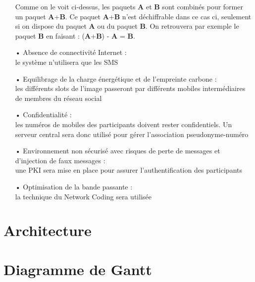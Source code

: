 \documentclass[a4paper, 12pt]{article}
\begin{document}
\begin{itemize}
            Comme on le voit ci-dessus, les paquets \textbf{A} et \textbf{B} sont combinés pour former un paquet \textbf{A}+\textbf{B}. Ce paquet \textbf{A}+\textbf{B} n'est déchiffrable dans ce cas ci, seulement si on dispose du paquet \textbf{A} ou du paquet \textbf{B}.
            On retrouvera par exemple le paquet \textbf{B} en faisant : (\textbf{A}+\textbf{B}) - \textbf{A} = \textbf{B}.
            \\
            
    \item [•] Absence de connectivité Internet :
    \\
    le système n'utilisera que les SMS
    \\
    
    \item [•] Equilibrage de la charge énergétique et de l'empreinte carbone :
    \\
    les différents slots de l'image passeront par différents mobiles intermédiaires
    de membres du réseau social
    \\
    
    \item [•]  Confidentialité :
    \\
     les numéros de mobiles des participants doivent rester confidentiels.
     Un serveur central sera donc utilisé pour gérer l'association
     pseudonyme-numéro
     \\
     \item [•] Environnement non sécurisé avec risques de perte de messages
        et d'injection de faux messages :
        \\
        une PKI sera mise en place pour assurer l'authentification des participants
     \\
     
     \item [•] Optimisation de la bande passante :
     \\
    la technique du Network Coding sera utilisée

\end{itemize}

\section{Architecture}

\section{Diagramme de Gantt}
\end{document}
